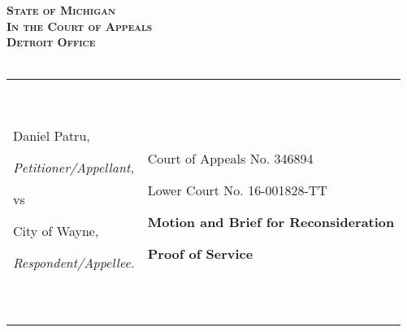\documentclass[12pt,\documentclassflag]{michiganCourtOfAppealsBrief}
\begin{document}





\begin{centering}
\bf\scshape State of Michigan\\In the Court of Appeals\\Detroit Office\\~\\ 
\rm 

\makeandtab
\setlength{\tabcolsep}{20pt}%
\begin{tabular}{p{} p{}}
\cline{1-2}
  {~

  \raggedright Daniel Patru,\par
  \hfill\textit{Petitioner/Appellant,}
  \vspace{.5\baselineskip}\par
  vs\par
  \vspace{.5\baselineskip}
  \raggedright City of Wayne,\par
  \hfill\textit{Respondent/Appellee.}
  
  ~} &  {~
       \par\par
       \hfill Court of Appeals No. 346894\par
       \hfill Lower Court No. 16-001828-TT\par\vspace{\baselineskip}

       \hfill \raggedleft\textbf{Motion and Brief for Reconsideration}\vspace{.5\baselineskip}\par
       \hfill \textbf{Proof of Service}\newline      
  ~}
  \\ \cline{1-2}\vspace{2mm}
  

\end{tabular}
\end{centering}
\end{document}

